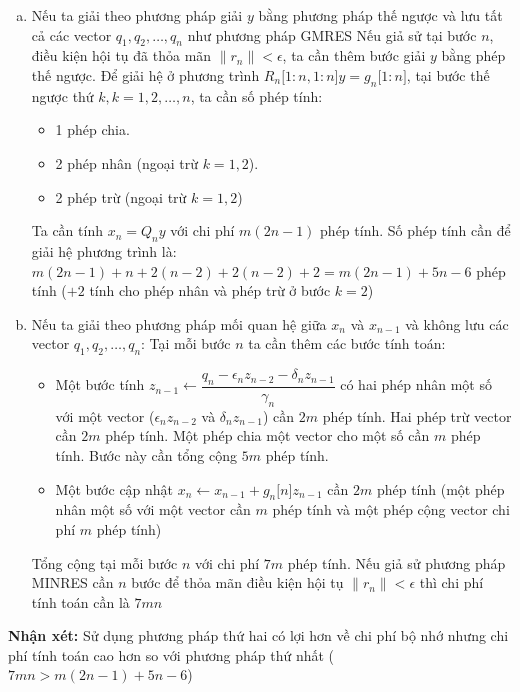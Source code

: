 \documentclass[14pt, a4paper]{article}
\numberwithin{equation}{section}
\numberwithin{algorithm}{section}
\numberwithin{figure}{section}
\numberwithin{dl}{section}
\numberwithin{md}{section}
\numberwithin{bd}{section}
\numberwithin{dn}{section}
\begin{document}
\begin{enumerate}[a)] %
    \item Nếu ta giải theo phương pháp giải $y$ bằng phương pháp thế ngược và lưu tất cả các vector $q_1, q_2, \dots, q_n$ như phương pháp GMRES
    Nếu giả sử tại bước $n$, điều kiện hội tụ đã thỏa mãn $\lVert r_n \rVert < \epsilon$, ta cần thêm bước giải $y$ bằng phép thế ngược. Để giải hệ ở phương trình $R_n \lbrack 1:n, 1:n \rbrack y = g_n \lbrack 1:n \rbrack$, tại bước thế ngược thứ $k, k=1,2,\dots,n$, ta cần số phép tính:
    \begin{itemize}
        \item 1 phép chia.
        \item 2 phép nhân (ngoại trừ $k=1,2$).
        \item 2 phép trừ (ngoại trừ $k=1,2$)
    \end{itemize}
    Ta cần tính $x_n = Q_n y$ với chi phí $m(2n-1)$ phép tính.
    Số phép tính cần để giải hệ phương trình là: $m(2n-1) + n + 2(n-2) + 2(n-2) + 2=m(2n-1) + 5n-6$ phép tính ($+2$ tính cho phép nhân và phép trừ ở bước $k=2$)
    \item Nếu ta giải theo phương pháp mối quan hệ giữa $x_n$ và $x_{n-1}$ và không lưu các vector $q_1, q_2, \dots, q_n$:
    Tại mỗi bước $n$ ta cần thêm các bước tính toán:
    \begin{itemize}
        \item Một bước tính $z_{n-1} \leftarrow \dfrac{q_n - \epsilon_n z_{n-2} - \delta_n z_{n-1}}{\gamma_n}$ có hai phép nhân một số với một vector ($\epsilon_n z_{n-2}$ và $\delta_n z_{n-1}$) cần $2m$ phép tính. Hai phép trừ vector cần $2m$ phép tính. Một phép chia một vector cho một số cần $m$ phép tính. Bước này cần tổng cộng $5m$ phép tính.
        \item Một bước cập nhật $x_n \leftarrow x_{n-1} + g_n \lbrack n \rbrack z_{n-1}$ cần $2m$ phép tính (một phép nhân một số với một vector cần $m$ phép tính và một phép cộng vector chi phí $m$ phép tính)
    \end{itemize}
    Tổng cộng tại mỗi bước $n$ với chi phí $7m$ phép tính. Nếu giả sử phương pháp MINRES cần $n$ bước để thỏa mãn điều kiện hội tụ $\lVert r_n \rVert < \epsilon$ thì chi phí tính toán cần là $7mn$
\end{enumerate}

\textbf{Nhận xét:} Sử dụng phương pháp thứ hai có lợi hơn về chi phí bộ nhớ nhưng chi phí tính toán cao hơn so với phương pháp thứ nhất ($7mn > m(2n-1) + 5n - 6$)
\end{document}
